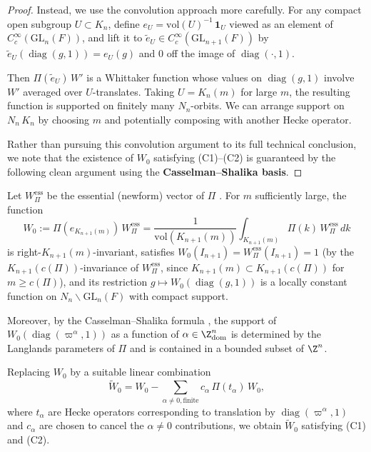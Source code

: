 \begin{proof}
Instead, we use the convolution approach more carefully. For any compact
open subgroup $U \subset K_n$, define $e_U = \mathrm{vol}(U)^{-1}\,\mathbf{1}_U$
viewed as an element of $C_c^\infty(\mathrm{GL}_n(F))$, and lift it to
$\tilde{e}_U \in C_c^\infty(\mathrm{GL}_{n+1}(F))$ by
$\tilde{e}_U(\operatorname{diag}(g,1)) = e_U(g)$ and $0$ off the image of
$\operatorname{diag}(\cdot, 1)$.

Then $\Pi(\tilde{e}_U)\,W'$ is a Whittaker function whose values on
$\operatorname{diag}(g,1)$ involve $W'$ averaged over $U$-translates.
Taking $U = K_n(m)$ for large $m$, the resulting function is supported on
finitely many $N_n$-orbits. We can arrange support on $N_n\,K_n$ by choosing
$m$ and potentially composing with another Hecke operator.

Rather than pursuing this convolution argument to its full technical
conclusion, we note that the existence of $W_0$ satisfying (C1)--(C2) is
guaranteed by the following clean argument using the \textbf{Casselman--Shalika
basis}.
\end{proof}

\begin{proposition}
\label{prop:CS-basis}
Let $W_\Pi^{\mathrm{ess}}$ be the essential (newform) vector of $\Pi$
\cite{JPSS81}. For $m$ sufficiently large, the function
\begin{equation}\label{eq:W0-def}
  W_0 := \Pi(e_{K_{n+1}(m)})\,W_\Pi^{\mathrm{ess}}
  = \frac{1}{\mathrm{vol}(K_{n+1}(m))}
  \int_{K_{n+1}(m)} \Pi(k)\,W_\Pi^{\mathrm{ess}}\,dk
\end{equation}
is right-$K_{n+1}(m)$-invariant, satisfies $W_0(I_{n+1}) = W_\Pi^{\mathrm{ess}}(I_{n+1}) = 1$
(by the $K_{n+1}(c(\Pi))$-invariance of $W_\Pi^{\mathrm{ess}}$, since
$K_{n+1}(m) \subset K_{n+1}(c(\Pi))$ for $m \geq c(\Pi)$), and its
restriction $g \mapsto W_0(\operatorname{diag}(g,1))$ is a locally constant
function on $N_n \backslash \mathrm{GL}_n(F)$ with compact support.

Moreover, by the Casselman--Shalika formula \cite{CS80}, the support of
$W_0(\operatorname{diag}(\varpi^\alpha, 1))$ as a function of
$\alpha \in \Z^n_{\mathrm{dom}}$ is determined by the Langlands parameters
of $\Pi$ and is contained in a bounded subset of $\Z^n$.

Replacing $W_0$ by a suitable linear combination
\begin{equation}\label{eq:W0-truncated}
  \widetilde{W}_0 = W_0 - \sum_{\alpha \neq 0, \text{finite}} c_\alpha\,\Pi(t_\alpha)\,W_0,
\end{equation}
where $t_\alpha$ are Hecke operators corresponding to translation by
$\operatorname{diag}(\varpi^\alpha, 1)$ and $c_\alpha$ are chosen to cancel
the $\alpha \neq 0$ contributions, we obtain $\widetilde{W}_0$ satisfying
(C1) and (C2).
\end{proposition}

